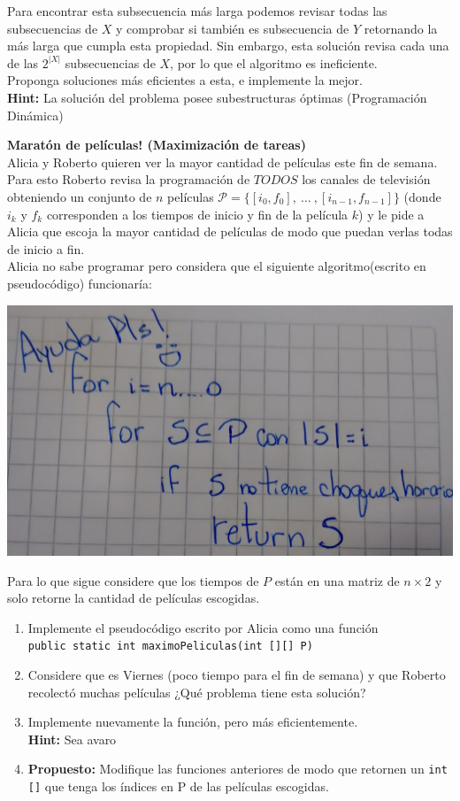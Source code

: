 \documentclass[dcc]{fcfmcourse}
\begin{document}
\begin{problems}
Para encontrar esta subsecuencia más larga podemos revisar todas las subsecuencias de $X$ y comprobar si también es subsecuencia de $Y$ retornando la más larga que cumpla esta propiedad. Sin embargo, esta solución revisa cada una de las $2^{|X|}$ subsecuencias de $X$, por lo que el algoritmo es ineficiente.\\

Proponga soluciones más eficientes a esta, e implemente la mejor.\\
\textbf{Hint:} La solución del problema posee subestructuras óptimas (Programación Dinámica)


\problem \textbf{Maratón de películas! (Maximización de tareas)}\\
Alicia y Roberto quieren ver la mayor cantidad de películas este fin de semana. Para esto Roberto revisa la programación de $TODOS$ los canales de televisión obteniendo un conjunto de $n$ películas $\mathcal{P} =\lbrace [i_{0},f_{0}],\ \ldots \ , [i_{n-1},f_{n-1}] \rbrace$ (donde $i_{k}$ y $f_{k}$ corresponden a los tiempos de inicio y fin de la película $k$) y le pide a Alicia que escoja la mayor cantidad de películas de modo que puedan verlas todas de inicio a fin.\\

Alicia no sabe programar pero considera que el siguiente algoritmo(escrito en pseudocódigo) funcionaría:
\begin{center}
\includegraphics[scale=0.18]{Algoritmo.jpg}
\end{center}
Para lo que sigue considere que los tiempos de $P$ están en una matriz de $n \times 2$ y solo retorne la cantidad de películas escogidas.
\begin{enumerate}
    \item Implemente el pseudocódigo escrito por Alicia como una función\\ \texttt{public static int maximoPeliculas(int [][] P)}
    \item Considere que es Viernes (poco tiempo para el fin de semana) y que Roberto recolectó muchas películas ¿Qué problema tiene esta solución?
    \item Implemente nuevamente la función, pero más eficientemente.\\
    \textbf{Hint:} Sea avaro
    \item \textbf{Propuesto:} Modifique las funciones anteriores de modo que retornen un \texttt{int []} que tenga los índices en P de las películas escogidas.
\end{enumerate}
\end{problems}
\end{document}
